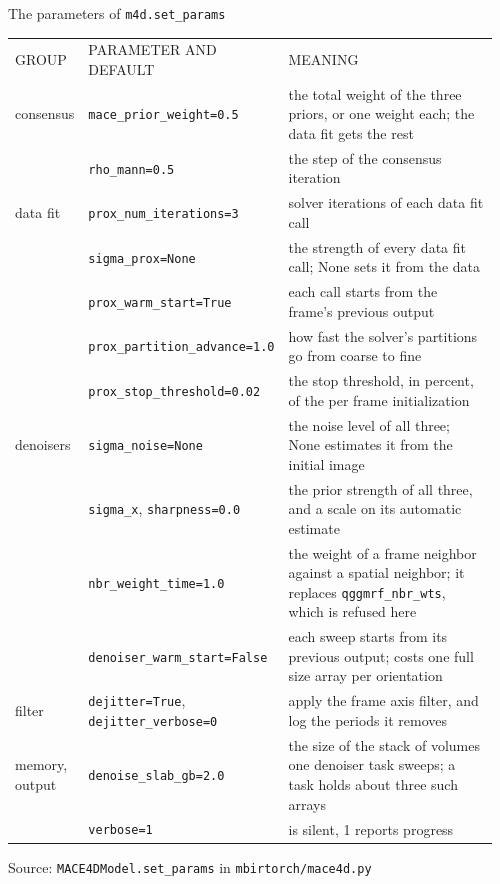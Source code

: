 \documentclass[aspectratio=169,10pt]{beamer}
\newcommand{\tagchip}[2]{{\setlength{\fboxsep}{2.5pt}\setlength{\fboxrule}{0.6pt}%
  \fcolorbox{white}{#1}{\textcolor{white}{\footnotesize\bfseries\strut #2}}}}
\newcommand{\fourdchip}{\tagchip{safeGreen}{MACE4D}}
\newcommand{\speclabel}[1]{\textcolor{inkGray}{\scriptsize\MakeUppercase{#1}}}
\newcommand{\source}[1]{\par\vfill{\scriptsize\textcolor{inkGray}{Source: #1}\par}}
\newcommand{\rowrule}{\arrayrulecolor{inkGray!35}\hline\noalign{\vskip 2pt}}
\begin{document}
\begin{frame}{The parameters of \texttt{m4d.set\_params} \hfill \fourdchip}
  \vspace{0pt}
  {\scriptsize
  \begin{tabular}{@{}>{\raggedright\arraybackslash}p{0.11\linewidth}@{\hspace{5pt}}>{\raggedright\arraybackslash}p{0.27\linewidth}@{\hspace{5pt}}>{\raggedright\arraybackslash}p{0.58\linewidth}@{}}
    \speclabel{group} & \speclabel{parameter and default} & \speclabel{meaning} \\[2pt]
    consensus & \texttt{mace\_prior\_weight=0.5} & the total weight of the three priors, or one weight each; the data fit gets the rest \\
      & \texttt{rho\_mann=0.5} & the step of the consensus iteration \\[2pt]
    \rowrule
    data fit & \texttt{prox\_num\_iterations=3} & solver iterations of each data fit call \\
      & \texttt{sigma\_prox=None} & the strength of every data fit call; None sets it from the data \\
      & \texttt{prox\_warm\_start=True} & each call starts from the frame's previous output \\
      & \texttt{prox\_partition\_advance=1.0} & how fast the solver's partitions go from coarse to fine \\
      & \texttt{prox\_stop\_threshold=0.02} & the stop threshold, in percent, of the per frame initialization \\[2pt]
    \rowrule
    denoisers & \texttt{sigma\_noise=None} & the noise level of all three; None estimates it from the initial image \\
      & \texttt{sigma\_x}, \texttt{sharpness=0.0} & the prior strength of all three, and a scale on its automatic estimate \\
      & \texttt{nbr\_weight\_time=1.0} & the weight of a frame neighbor against a spatial neighbor; it replaces \texttt{qggmrf\_nbr\_wts}, which is refused here \\
      & \texttt{denoiser\_warm\_start=False} & each sweep starts from its previous output; costs one full size array per orientation \\[2pt]
    \rowrule
    filter & \texttt{dejitter=True}, \texttt{dejitter\_verbose=0} & apply the frame axis filter, and log the periods it removes \\[2pt]
    \rowrule
    memory, output & \texttt{denoise\_slab\_gb=2.0} & the size of the stack of volumes one denoiser task sweeps; a task holds about three such arrays \\
      & \texttt{verbose=1} & 0 is silent, 1 reports progress \\
  \end{tabular}}
  \source{\texttt{MACE4DModel.set\_params} in \texttt{mbirtorch/mace4d.py}}
\end{frame}
\end{document}

